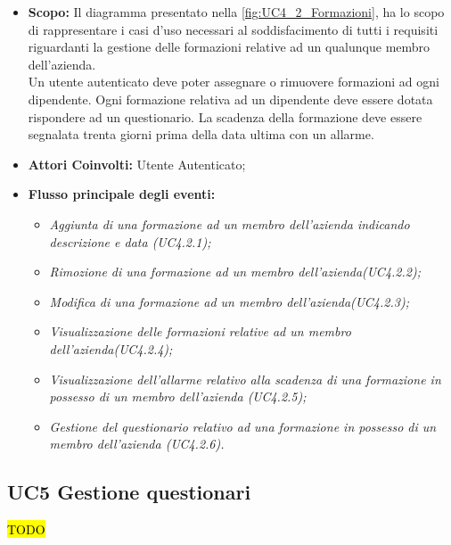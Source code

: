 		\begin{itemize}
			\item \textbf{Scopo:} Il diagramma presentato nella \autoref{fig:UC4_2_Formazioni}, ha lo scopo di rappresentare i casi d'uso necessari al soddisfacimento di tutti i requisiti riguardanti la gestione delle formazioni relative ad un qualunque membro dell'azienda. \\ 
			
			Un utente autenticato deve poter assegnare o rimuovere formazioni ad ogni dipendente. 
			Ogni formazione relativa ad un dipendente deve essere dotata rispondere ad un questionario. La scadenza della formazione deve essere segnalata trenta giorni prima della data ultima con un allarme.
			\item \textbf{Attori Coinvolti:} Utente Autenticato;
			\item \textbf{Flusso principale degli eventi:} 
			\begin{itemize}
				\item \textit{Aggiunta di una formazione ad un membro dell'azienda indicando descrizione e data (UC4.2.1);}
				\item \textit{Rimozione di una formazione ad un membro dell'azienda(UC4.2.2);}
				\item \textit{Modifica di una formazione ad un membro dell'azienda(UC4.2.3);}
				\item \textit{Visualizzazione delle formazioni relative ad un membro dell'azienda(UC4.2.4);}
				\item \textit{Visualizzazione dell'allarme relativo alla scadenza di una formazione in possesso di un membro dell'azienda (UC4.2.5);}
				\item \textit{Gestione del questionario relativo ad una formazione in possesso di un membro dell'azienda (UC4.2.6).}
			\end{itemize}
		\end{itemize}
		

		
	\subsection{UC5 Gestione questionari}
		\label{section:UC5}	
		\hl{TODO}

